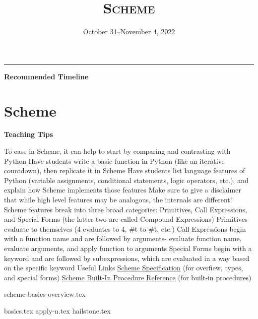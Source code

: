 \documentclass{exam}
\title{\textsc{Scheme}}
\date{October 31--November 4, 2022}
\begin{document}
\maketitle
\rule{\textwidth}{0.15em}
\fontsize{12}{15}\selectfont

\begin{guide}
\begin{blocksection}
\textbf{Recommended Timeline}
\end{blocksection}
\end{guide}

\section{Scheme}
\begin{guide}
\begin{blocksection}
\textbf{Teaching Tips}
\begin{outline}[enumerate]
    \1 To ease in Scheme, it can help to start by comparing and contrasting with Python
    \2 Have students write a basic function in Python (like an iterative countdown), then replicate it in Scheme
    \2 Have students list language features of Python (variable assignments, conditional statements, logic operators, etc.), and explain how Scheme implements those features
    \2 Make sure to give a disclaimer that while high level features may be analogous, the internals are different!
    \1 Scheme features break into three broad categories: Primitives, Call Expressions, and Special Forms (the latter two are called Compound Expressions)
    \2 Primitives evaluate to themselves (4 evaluates to 4, \#t to \#t, etc.)
    \2 Call Expressions begin with a function name and are followed by arguments- evaluate function name, evaluate arguments, and apply function to arguments
    \2 Special Forms begin with a keyword and are followed by subexpressions, which are evaluated in a way based on the specific keyword
    \1 Useful Links
    \2 \href{https://cs61a.org/articles/scheme-spec/}{Scheme Specification} (for overfiew, types, and special forms)
    \2 \href{https://cs61a.org/articles/scheme-builtins/}{Scheme Built-In Procedure Reference} (for built-in procedures)
\end{outline}
\end{blocksection}
\end{guide}

{scheme-basics-overview.tex}
\newpage
\begin{questions}
{basics.tex}
{apply-n.tex}
{hailstone.tex}
\end{questions}
\end{document}
